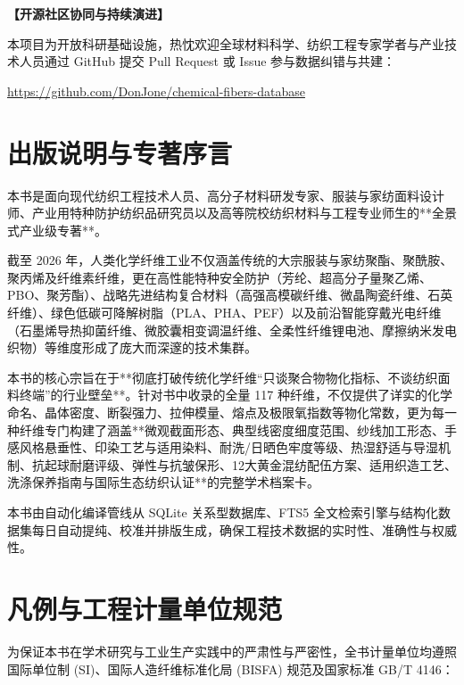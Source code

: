 \documentclass[11pt,openright,twoside,UTF8]{ctexbook}
\begin{document}
\vspace{0.4cm}
\noindent\textbf{【开源社区协同与持续演进】}\par
\noindent 本项目为开放科研基础设施，热忱欢迎全球材料科学、纺织工程专家学者与产业技术人员通过 GitHub 提交 Pull Request 或 Issue 参与数据纠错与共建：\par
\noindent \url{https://github.com/DonJone/chemical-fibers-database}

\chapter*{出版说明与专著序言}

本书是面向现代纺织工程技术人员、高分子材料研发专家、服装与家纺面料设计师、产业用特种防护纺织品研究员以及高等院校纺织材料与工程专业师生的**全景式产业级专著**。

截至 2026 年，人类化学纤维工业不仅涵盖传统的大宗服装与家纺聚酯、聚酰胺、聚丙烯及纤维素纤维，更在高性能特种安全防护（芳纶、超高分子量聚乙烯、PBO、聚芳酯）、战略先进结构复合材料（高强高模碳纤维、微晶陶瓷纤维、石英纤维）、绿色低碳可降解树脂（PLA、PHA、PEF）以及前沿智能穿戴光电纤维（石墨烯导热抑菌纤维、微胶囊相变调温纤维、全柔性纤维锂电池、摩擦纳米发电织物）等维度形成了庞大而深邃的技术集群。

本书的核心宗旨在于**彻底打破传统化学纤维“只谈聚合物物化指标、不谈纺织面料终端”的行业壁垒**。针对书中收录的全量 117 种纤维，不仅提供了详实的化学命名、晶体密度、断裂强力、拉伸模量、熔点及极限氧指数等物化常数，更为每一种纤维专门构建了涵盖**微观截面形态、典型线密度细度范围、纱线加工形态、手感风格悬垂性、印染工艺与适用染料、耐洗/日晒色牢度等级、热湿舒适与导湿机制、抗起球耐磨评级、弹性与抗皱保形、12大黄金混纺配伍方案、适用织造工艺、洗涤保养指南与国际生态纺织认证**的完整学术档案卡。

本书由自动化编译管线从 SQLite 关系型数据库、FTS5 全文检索引擎与结构化数据集每日自动提纯、校准并排版生成，确保工程技术数据的实时性、准确性与权威性。

\chapter*{凡例与工程计量单位规范}

为保证本书在学术研究与工业生产实践中的严肃性与严密性，全书计量单位均遵照国际单位制 (SI)、国际人造纤维标准化局 (BISFA) 规范及国家标准 GB/T 4146：
\end{document}
